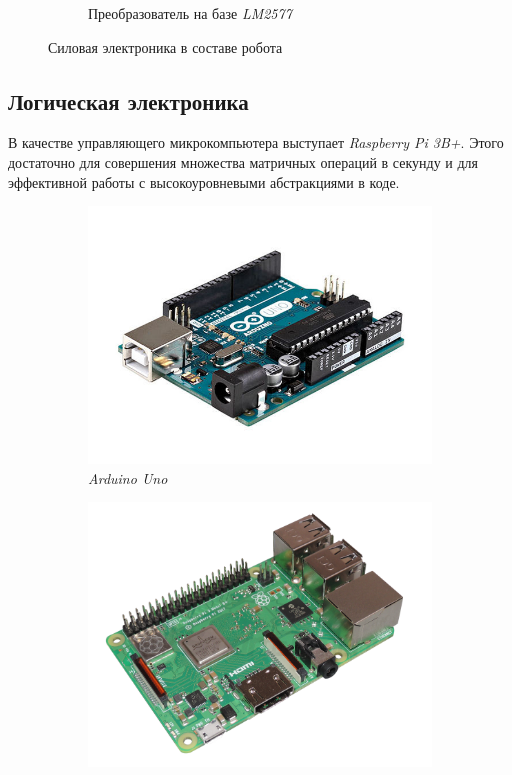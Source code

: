 \begin{figure}[ht]
\begin{subfigure}[b]{0.45\textwidth}
        \caption{Преобразователь на базе \textit{LM2577}}
    \end{subfigure}
     
    \caption{Силовая электроника в составе робота}
    \label{}
\end{figure}

\subsection{Логическая электроника}
В качестве управляющего микрокомпьютера выступает \textit{Raspberry Pi 3B+}. Этого достаточно для совершения множества матричных операций в секунду и для эффективной работы с высокоуровневыми абстракциями в коде.

\begin{figure}[ht]
    \centering
    \begin{subfigure}[b]{0.45\textwidth}    
        \centering
        \includegraphics[scale=0.35]{chapter_mechanics_construction/figure3.jpg}
        \caption{\textit{Arduino Uno}}
    \end{subfigure}
    \begin{subfigure}[b]{0.45\textwidth}
        \centering
        \includegraphics[scale=0.2]{chapter_mechanics_construction/figure3.png}

\end{subfigure}
\end{figure}
